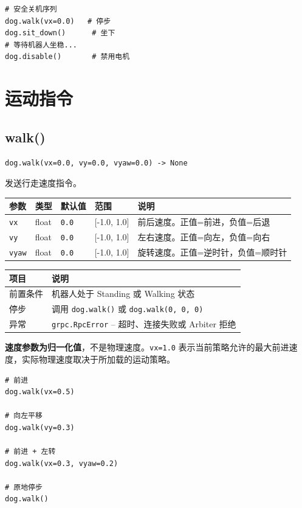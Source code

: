 \documentclass[a4paper,11pt,openany]{book}
\begin{document}
\begin{lstlisting}[style=python]
# 安全关机序列
dog.walk(vx=0.0)   # 停步
dog.sit_down()      # 坐下
# 等待机器人坐稳...
dog.disable()       # 禁用电机
\end{lstlisting}

\section{运动指令}

\subsection{walk()}

\begin{lstlisting}[style=python,numbers=none]
dog.walk(vx=0.0, vy=0.0, vyaw=0.0) -> None
\end{lstlisting}

发送行走速度指令。

\begin{longtable}{lllll}
\toprule
参数 & 类型 & 默认值 & 范围 & 说明 \\
\midrule
\endhead
\texttt{vx} & float & \texttt{0.0} & {[}-1.0, 1.0{]} & 前后速度。正值=前进，负值=后退 \\
\texttt{vy} & float & \texttt{0.0} & {[}-1.0, 1.0{]} & 左右速度。正值=向左，负值=向右 \\
\texttt{vyaw} & float & \texttt{0.0} & {[}-1.0, 1.0{]} & 旋转速度。正值=逆时针，负值=顺时针 \\
\bottomrule
\end{longtable}

\begin{longtable}{ll}
\toprule
项目 & 说明 \\
\midrule
\endhead
前置条件 & 机器人处于 Standing 或 Walking 状态 \\
停步 & 调用 \texttt{dog.walk()} 或 \texttt{dog.walk(0, 0, 0)} \\
异常 & \texttt{grpc.RpcError} -- 超时、连接失败或 Arbiter 拒绝 \\
\bottomrule
\end{longtable}

\noindent\textbf{速度参数为归一化值}，不是物理速度。\texttt{vx=1.0} 表示当前策略允许的最大前进速度，实际物理速度取决于所加载的运动策略。

\begin{lstlisting}[style=python]
# 前进
dog.walk(vx=0.5)

# 向左平移
dog.walk(vy=0.3)

# 前进 + 左转
dog.walk(vx=0.3, vyaw=0.2)

# 原地停步
dog.walk()
\end{lstlisting}
\end{document}
